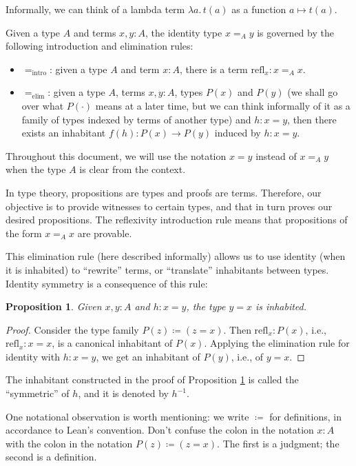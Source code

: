 \documentclass[12pt]{article}
\newtheorem{proposition}{Proposition}[section]
\theoremstyle{definition}
\theoremstyle{remark}
\newcommand{\doublequotes}[1]{``#1''}
\begin{document}
Informally, we can think of a lambda term $\lambda a . \, t(a)$ as a function $a \mapsto t(a)$. 

Given a type $A$ and terms $x,y : A$, the identity type $x =_A y$ is governed by the following introduction and elimination rules:

\begin{itemize}
  \item $=_{\text{intro}}$: given a type $A$ and term $x:A$, there is a term $\text{refl}_x : x =_A x$.
  \item $=_{\text{elim}}$: given a type $A$, terms $x,y : A$, types $P(x)$ and $P(y)$ (we shall go over what $P(\cdot)$ means at a later time, but we can think informally of it as a family of types indexed by terms of another type) and $h:x=y$, then there exists an inhabitant $f(h): P(x) \to P(y)$ induced by $h:x=y$.
\end{itemize}

Throughout this document, we will use the notation $x = y$ instead of $x =_A y$ when the type $A$ is clear from the context.

In type theory, propositions are types and proofs are terms. Therefore, our objective is to provide witnesses to certain types, and that in turn proves our desired propositions.
The reflexivity introduction rule means that propositions of the form $x =_A x$ are provable. 

This elimination rule (here described informally) allows us to use identity (when it is inhabited) to \doublequotes{rewrite} terms, or \doublequotes{translate} inhabitants between types. Identity symmetry is a consequence of this rule:

\begin{proposition}\label{prop:identity_symmetry}
Given $x,y:A$ and $h:x=y$, the type $y=x$ is inhabited.
\end{proposition}
\begin{proof}
Consider the type family $P(z) \coloneqq (z=x)$. Then $\text{refl}_x : P(x)$, i.e., $\text{refl}_x : x = x$, is a canonical inhabitant of $P(x)$. Applying the elimination rule for identity with $h:x=y$, we get an inhabitant of $P(y)$, i.e., of $y=x$.
\end{proof}

The inhabitant constructed in the proof of Proposition \ref{prop:identity_symmetry} is called the \doublequotes{symmetric} of $h$, and it is denoted by $h^{-1}$.

One notational observation is worth mentioning: we write $\coloneqq$ for definitions, in accordance to Lean's convention. Don't confuse the colon in the notation $x:A$ with the colon in the notation $P(z) \coloneqq (z=x)$. The first is a judgment; the second is a definition.
\end{document}
